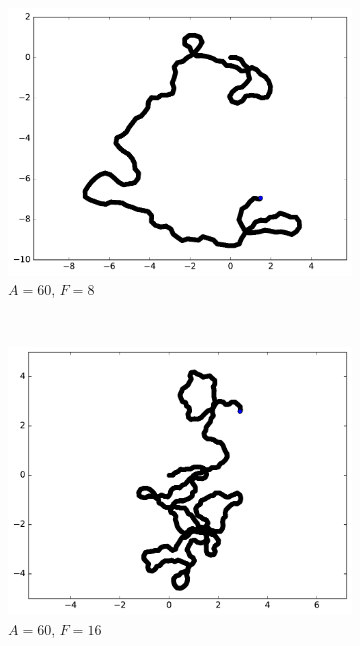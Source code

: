 \begin{appendices}
\begin{figure}[htbp]
\begin{subfigure}[t]{\subImgWmo}
			\includegraphics[width=\textwidth]{figures/ch3/synTraj_219_60_8}
			\caption[$A = 60$, $F=8$]{$A = 60$, $F=8$}
			\label{fig:synTraj_219_60_8}
		\end{subfigure}
		~
		\begin{subfigure}[t]{\subImgWmo}
			\centering
			\includegraphics[width=\textwidth]{figures/ch3/synTraj_219_60_16}
			\caption[$A = 60$, $F=16$]{$A = 60$, $F=16$}
			\label{fig:synTraj_219_60_16}
		\end{subfigure}
		~
		\begin{subfigure}[t]{\subImgWmo}
			\centering

\end{subfigure}
\end{figure}
\end{appendices}
